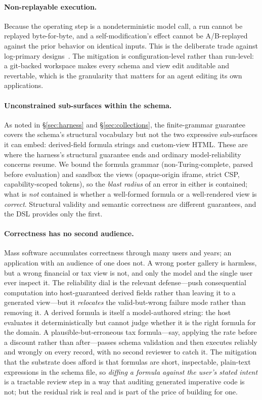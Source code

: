 \documentclass[11pt]{article}
\begin{document}
\paragraph{Non-replayable execution.}
Because the operating step is a nondeterministic model call, a run cannot be
replayed byte-for-byte, and a self-modification's effect cannot be A/B-replayed
against the prior behavior on identical inputs. This is the deliberate trade
against log-primary designs~\citep{ynakajima2026log}. The mitigation is
configuration-level rather than run-level: a git-backed workspace makes every
schema and view edit auditable and revertable, which is the granularity that
matters for an agent editing its own applications.

\paragraph{Unconstrained sub-surfaces within the schema.}
As noted in \S\ref{sec:harness} and \S\ref{sec:collections}, the finite-grammar
guarantee covers the schema's structural vocabulary but not the two expressive
sub-surfaces it can embed: derived-field formula strings and custom-view HTML.
These are where the harness's structural guarantee ends and ordinary
model-reliability concerns resume. We bound the formula grammar (non-Turing-complete,
parsed before evaluation) and sandbox the views (opaque-origin iframe, strict CSP,
capability-scoped tokens), so the \emph{blast radius} of an error in either is
contained; what is \emph{not} contained is whether a well-formed formula or a
well-rendered view is \emph{correct}. Structural validity and semantic correctness
are different guarantees, and the DSL provides only the first.

\paragraph{Correctness has no second audience.}
Mass software accumulates correctness through many users and years; an application
with an audience of one does not. A wrong poster gallery is harmless, but a wrong
financial or tax view is not, and only the model and the single user ever inspect
it. The reliability dial is the relevant defense---push consequential computation
into host-guaranteed derived fields rather than leaving it to a generated
view---but it \emph{relocates} the valid-but-wrong failure mode rather than
removing it. A derived formula is itself a model-authored string: the host
evaluates it deterministically but cannot judge whether it is the right formula for
the domain. A plausible-but-erroneous tax formula---say, applying the rate before a
discount rather than after---passes schema validation and then executes reliably
and wrongly on every record, with no second reviewer to catch it. The mitigation
that the substrate does afford is that formulas are short, inspectable, plain-text
expressions in the schema file, so \emph{diffing a formula against the user's
stated intent} is a tractable review step in a way that auditing generated
imperative code is not; but the residual risk is real and is part of the price of
building for one.
\end{document}
